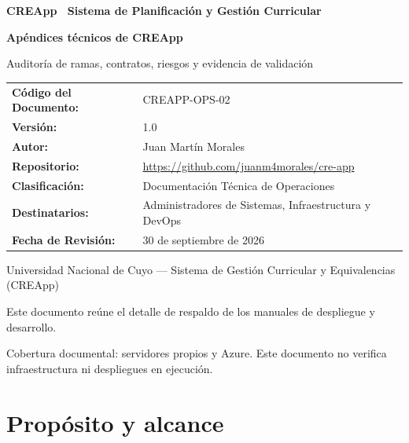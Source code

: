 \documentclass[10pt,a4paper,oneside]{article}
\begin{document}
\begin{titlepage}
\thispagestyle{empty}
\vspace*{1.5cm}
{\Large\bfseries\color{CREBlue} CREApp \textbar\ Sistema de Planificación y Gestión Curricular\par}
\vspace{1.2cm}
{\Huge\bfseries Apéndices técnicos de CREApp\par}
\vspace{0.6cm}
{\large\color{black!80} Auditoría de ramas, contratos, riesgos y evidencia de validación\par}
\vspace{1.0cm}
\noindent{\color{CREBlue}\rule{\textwidth}{1.5pt}}
\vspace{1.0cm}

\begin{table}[h]
\centering
\begin{tabular}{ll}
\toprule
\textbf{Código del Documento:} & CREAPP-OPS-02 \\
\textbf{Versión:} & 1.0 \\
\textbf{Autor:} & Juan Martín Morales \\
\textbf{Repositorio:} & \url{https://github.com/juanm4morales/cre-app} \\
\textbf{Clasificación:} & Documentación Técnica de Operaciones \\
\textbf{Destinatarios:} & Administradores de Sistemas, Infraestructura y DevOps \\
\textbf{Fecha de Revisión:} & 30 de septiembre de 2026 \\
\bottomrule
\end{tabular}
\end{table}

\vfill
{\small\color{black!70}
Universidad Nacional de Cuyo --- Sistema de Gestión Curricular y Equivalencias (CREApp)\par
Este documento reúne el detalle de respaldo de los manuales de despliegue y desarrollo.
\par\vspace{0.25em}
Cobertura documental: servidores propios y Azure. Este documento no verifica infraestructura ni despliegues en ejecución.
}
\end{titlepage}
\tableofcontents
\clearpage
{}
\section*{Propósito y alcance}
\end{document}
